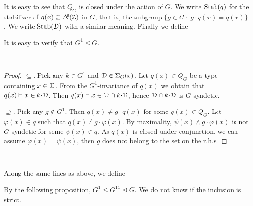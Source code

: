 It is easy to see that $Q_G$ is closed under the action of $G$.
We write ${\rm Stab}(q)$ for the stabilizer of $q(x)\subseteq\BDelta(\Z)$ in $G$, that is, the subgroup $\{g\in G\ :\ g{\cdot}q(x)=q(x)\}$.
We write ${\rm Stab}(\EuScript D)$ with a similar meaning.
Finally we define


It is easy to verify that $G^1\trianglelefteq G$.

\begin{proposition}\label{prop_StabQ}\ \smallskip

  \smallskip
\end{proposition}

\begin{proof}
  $\subseteq$.
  Pick any $k\in G^1$ and $\EuScript D\in\Sigma_G(x)$.
  Let $q(x)\in Q_G$ be a type containing $x\in\EuScript D$.
  From the $G^1$-invariance of $q(x)$ we obtain that $q(x)\vdash x\in k{\cdot}\EuScript D$.
  Then $q(x)\vdash x\in \EuScript D\cap k{\cdot}\EuScript D$, hence $\EuScript D\cap k{\cdot}\EuScript D$ is $G$-syndetic.

  $\supseteq$.
  Pick any $g\notin G^1$.
  Then $q(x)\neq g{\cdot}q(x)$ for some $q(x)\in Q_G$.
  Let $\varphi(x)\in q$ such that $q(x)\not\vdash g{\cdot}\varphi(x)$.
  By maximality, $\psi(x)\wedge g{\cdot}\varphi(x)$ is not $G$-syndetic for some $\psi(x)\in q$.
  As $q(x)$ is closed under conjunction, we can assume $\varphi(x)=\psi(x)$, then $g$ does not belong to the set on the r.h.s.
\end{proof}


\begin{definition}\label{def_P}\ 

  \smallskip

  
\end{definition}

Along the same lines as above, we define


By the following proposition, $G^1\le G^{1\!1}\trianglelefteq G$.
We do not know if the inclusion is strict.

\begin{proposition}\label{prop_StabP}\ 

  \smallskip
\end{proposition}

